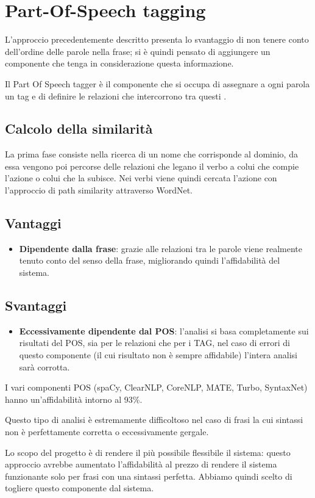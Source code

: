 \documentclass[twoside]{supsistudent}
\begin{document}
\section{Part-Of-Speech tagging}
L'approccio precedentemente descritto presenta lo svantaggio di non tenere conto dell'ordine delle parole nella frase; si è quindi pensato di aggiungere un componente che tenga in considerazione questa informazione.

Il Part Of Speech tagger è il componente che si occupa di assegnare a ogni parola un tag e di definire le relazioni che intercorrono tra questi .\cite{pos}\cite{posCategories}
\subsection{Calcolo della similarità}
La prima fase consiste nella ricerca di un nome che corrisponde al dominio, da essa vengono poi percorse delle relazioni che legano il verbo a colui che compie l'azione o colui che la subisce. Nei verbi viene quindi cercata l'azione con l'approccio di path similarity attraverso WordNet.
\subsection{Vantaggi}
\begin{itemize}
  \item \textbf{Dipendente dalla frase}: grazie alle relazioni tra le parole viene realmente tenuto conto del senso della frase, migliorando quindi l'affidabilità del sistema.
\end{itemize}
\subsection{Svantaggi}
\begin{itemize}
  \item \textbf{Eccessivamente dipendente dal POS}: l'analisi si basa completamente sui risultati del POS, sia per le relazioni che per i TAG, nel caso di errori di questo componente (il cui risultato non è sempre affidabile) l'intera analisi sarà corrotta.
\end{itemize}
I vari componenti POS (spaCy, ClearNLP, CoreNLP, MATE, Turbo, SyntaxNet) hanno un'affidabilità intorno al 93\%\cite{POS_scores}.

Questo tipo di analisi è estremamente difficoltoso nel caso di frasi la cui sintassi non è perfettamente corretta o eccessivamente gergale.  

Lo scopo del progetto è di rendere il più possibile flessibile il sistema: questo approccio avrebbe aumentato l'affidabilità al prezzo di rendere il sistema funzionante solo per frasi con una sintassi perfetta. Abbiamo quindi scelto di togliere questo componente dal sistema.
\newpage
\end{document}
